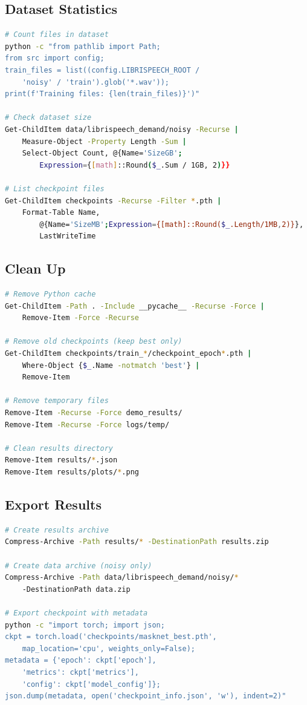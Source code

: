 \documentclass[12pt,a4paper]{article}
\begin{document}
\subsection{Dataset Statistics}

\begin{lstlisting}[language=bash]
# Count files in dataset
python -c "from pathlib import Path; 
from src import config; 
train_files = list((config.LIBRISPEECH_ROOT / 
    'noisy' / 'train').glob('*.wav')); 
print(f'Training files: {len(train_files)}')"

# Check dataset size
Get-ChildItem data/librispeech_demand/noisy -Recurse | 
    Measure-Object -Property Length -Sum | 
    Select-Object Count, @{Name='SizeGB';
        Expression={[math]::Round($_.Sum / 1GB, 2)}}

# List checkpoint files
Get-ChildItem checkpoints -Recurse -Filter *.pth | 
    Format-Table Name, 
        @{Name='SizeMB';Expression={[math]::Round($_.Length/1MB,2)}},
        LastWriteTime
\end{lstlisting}

\subsection{Clean Up}

\begin{lstlisting}[language=bash]
# Remove Python cache
Get-ChildItem -Path . -Include __pycache__ -Recurse -Force | 
    Remove-Item -Force -Recurse

# Remove old checkpoints (keep best only)
Get-ChildItem checkpoints/train_*/checkpoint_epoch*.pth | 
    Where-Object {$_.Name -notmatch 'best'} | 
    Remove-Item

# Remove temporary files
Remove-Item -Recurse -Force demo_results/
Remove-Item -Recurse -Force logs/temp/

# Clean results directory
Remove-Item results/*.json
Remove-Item results/plots/*.png
\end{lstlisting}

\subsection{Export Results}

\begin{lstlisting}[language=bash]
# Create results archive
Compress-Archive -Path results/* -DestinationPath results.zip

# Create data archive (noisy only)
Compress-Archive -Path data/librispeech_demand/noisy/* 
    -DestinationPath data.zip

# Export checkpoint with metadata
python -c "import torch; import json; 
ckpt = torch.load('checkpoints/masknet_best.pth', 
    map_location='cpu', weights_only=False); 
metadata = {'epoch': ckpt['epoch'], 
    'metrics': ckpt['metrics'], 
    'config': ckpt['model_config']}; 
json.dump(metadata, open('checkpoint_info.json', 'w'), indent=2)"
\end{lstlisting}
\end{document}

